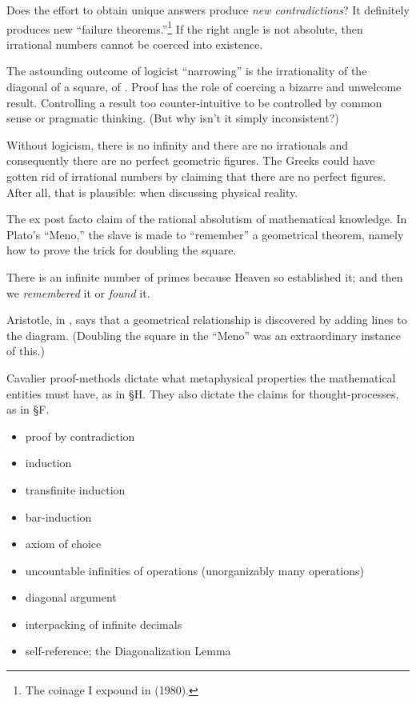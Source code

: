 Does the effort to obtain unique answers produce \textit{new contradictions}? It definitely produces new \enquote{failure theorems.}\footnote{The coinage I expound in  (1980).} If the right angle is not absolute, then irrational numbers cannot be coerced into existence.

The astounding outcome of logicist \enquote{narrowing} is the irrationality of the diagonal of a square, of . Proof has the role of coercing a bizarre and unwelcome result. Controlling a result too counter-intuitive to be controlled by common sense or pragmatic thinking. (But why isn't it simply inconsistent?)

Without logicism, there is no infinity and there are no irrationals and consequently there are no perfect geometric figures. The Greeks could have gotten rid of irrational numbers by claiming that there are no perfect figures. After all, that is plausible: when discussing physical reality.

The ex post facto claim of the rational absolutism of mathematical knowledge. In Plato's \enquote{Meno,} the slave is made to \enquote{remember} a geometrical theorem, namely how to prove the trick for doubling the square.

There is an infinite number of primes because Heaven so established it; and then we \textit{remembered} it or \textit{found} it.

Aristotle, in , says that a geometrical relationship is discovered by adding lines to the diagram. (Doubling the square in the \enquote{Meno} was an extraordinary instance of this.)

Cavalier proof-methods dictate what metaphysical properties the mathematical entities must have, as in {\S}H. They also dictate the claims for thought-processes, as in {\S}F.

\begin{itemize}
\item proof by contradiction
\item induction
\item transfinite induction
\item bar-induction
\item axiom of choice
\item uncountable infinities of operations (unorganizably many operations)
\item diagonal argument
\item interpacking of infinite decimals
\item self-reference; the Diagonalization Lemma
\end{itemize}


